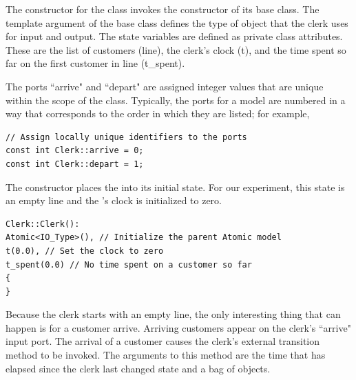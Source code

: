 The constructor for the  class invokes the constructor of its  base class. The template argument of the base class defines the type of object that the clerk uses for input and output. The  state variables are defined as private class attributes. These are the list of customers (line), the clerk's clock (t), and the time spent so far on the first customer in line (t\_spent).

The ports ``arrive" and ``depart" are assigned integer values that are unique within the scope of the  class. Typically, the ports for a model are numbered in a way that corresponds to the order in which they are listed; for example,
\begin{verbatim}
// Assign locally unique identifiers to the ports
const int Clerk::arrive = 0;
const int Clerk::depart = 1;
\end{verbatim}

The  constructor places the  into its initial state. For our experiment, this state is an empty line and the 's clock is initialized to zero.
\begin{verbatim}
Clerk::Clerk():
Atomic<IO_Type>(), // Initialize the parent Atomic model
t(0.0), // Set the clock to zero
t_spent(0.0) // No time spent on a customer so far
{
}
\end{verbatim}

Because the clerk starts with an empty line, the only interesting thing that can happen is for a customer arrive. Arriving customers appear on the clerk's ``arrive" input port. The arrival of a customer causes the clerk's external transition method to be invoked. The arguments to this method are the time that has elapsed since the clerk last changed state and a bag of  objects.


